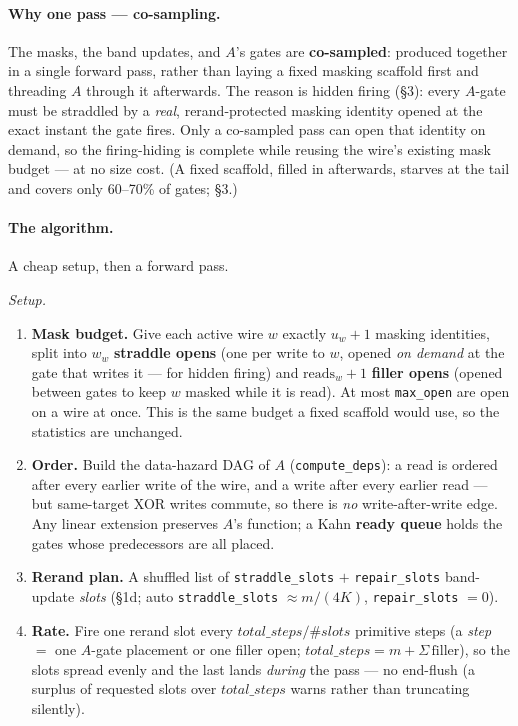 \documentclass[11pt]{article}
\newcommand{\doc}[1]{\texttt{#1}}
\begin{document}
\paragraph{Why one pass --- co-sampling.} The masks, the band updates, and $A$'s
gates are \textbf{co-sampled}: produced together in a single forward pass, rather
than laying a fixed masking scaffold first and threading $A$ through it afterwards.
The reason is hidden firing (\S3): every $A$-gate must be straddled by a
\emph{real}, rerand-protected masking identity opened at the exact instant the gate
fires. Only a co-sampled pass can open that identity on demand, so the
firing-hiding is complete while reusing the wire's existing mask budget --- at no
size cost. (A fixed scaffold, filled in afterwards, starves at the tail and covers
only 60--70\% of gates; \S3.)

\paragraph{The algorithm.} A cheap setup, then a forward pass.

\emph{Setup.}
\begin{enumerate}
\item \textbf{Mask budget.} Give each active wire $w$ exactly $u_w+1$ masking
  identities, split into $w_w$ \textbf{straddle opens} (one per write to $w$,
  opened \emph{on demand} at the gate that writes it --- for hidden firing) and
  $\mathrm{reads}_w+1$ \textbf{filler opens} (opened between gates to keep $w$
  masked while it is read). At most \doc{max\_open} are open on a wire at once.
  This is the same budget a fixed scaffold would use, so the statistics are
  unchanged.
\item \textbf{Order.} Build the data-hazard DAG of $A$ (\doc{compute\_deps}): a
  read is ordered after every earlier write of the wire, and a write after every
  earlier read --- but same-target XOR writes commute, so there is \emph{no}
  write-after-write edge. Any linear extension preserves $A$'s function; a Kahn
  \textbf{ready queue} holds the gates whose predecessors are all placed.
\item \textbf{Rerand plan.} A shuffled list of \doc{straddle\_slots} $+$
  \doc{repair\_slots} band-update \emph{slots} (\S1d; auto \doc{straddle\_slots}
  $\approx m/(4K)$, \doc{repair\_slots} $= 0$).
\item \textbf{Rate.} Fire one rerand slot every
  $\mathit{total\_steps}/\#\mathit{slots}$ primitive steps (a \emph{step} $=$ one
  $A$-gate placement or one filler open; $\mathit{total\_steps} = m +
  \Sigma\,\mathrm{filler}$), so the slots spread evenly and the last lands
  \emph{during} the pass --- no end-flush (a surplus of requested slots over
  $\mathit{total\_steps}$ warns rather than truncating silently).
\end{enumerate}
\end{document}
